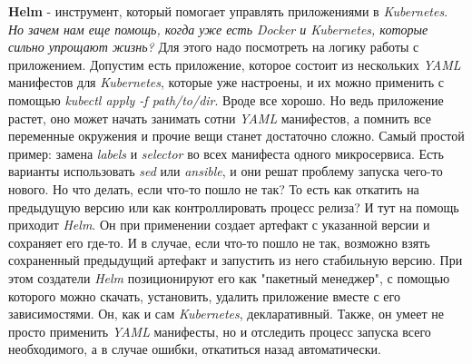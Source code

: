 \textbf{Helm} - инструмент, который помогает управлять приложениями в \textit{Kubernetes}. \textit{Но зачем нам еще помощь, когда уже есть Docker и Kubernetes, которые сильно упрощают жизнь?} Для этого надо посмотреть на логику работы с приложением. Допустим есть приложение, которое состоит из нескольких \textit{YAML} манифестов для \textit{Kubernetes}, которые уже настроены, и их можно применить с помощью \textit{kubectl apply -f path/to/dir}. Вроде все хорошо. Но ведь приложение растет, оно может начать занимать сотни \textit{YAML} манифестов, а помнить все переменные окружения и прочие вещи станет достаточно сложно. Самый простой пример: замена \textit{labels} и \textit{selector} во всех манифеста одного микросервиса. Есть варианты использовать \textit{sed} или \textit{ansible}, и они решат проблему запуска чего-то нового. Но что делать, если что-то пошло не так? То есть как откатить на предыдущую версию или как контроллировать процесс релиза? И тут на помощь приходит \textit{Helm}. Он при применении создает артефакт с указанной версии и сохраняет его где-то. И в случае, если что-то пошло не так, возможно взять сохраненный предыдущий артефакт и запустить из него стабильную версию. При этом создатели \textit{Helm} позиционируют его как "пакетный менеджер", с помощью которого можно скачать, установить, удалить приложение вместе с его зависимостями. Он, как и сам \textit{Kubernetes}, декларативный. Также, он умеет не просто применить \textit{YAML} манифесты, но и отследить процесс запуска всего необходимого, а в случае ошибки, откатиться назад автоматически.
